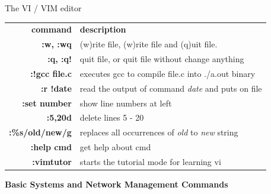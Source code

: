 \documentclass{beamer}
\begin{document}
\begin{frame}[t]
{\begin{minipage}[t]{.50\linewidth}
\begin{block}{The VI / VIM editor}
{\begin{minipage}[t]{0.470\textwidth}
            \begin{tabular}{r p{14cm} }
                \textbf{command} & \textbf{description}\\
                \textbf{:w, :wq} & (w)rite file, (w)rite file and (q)uit file.\\
                \textbf{:q, :q!} & quit file, or quit file without change anything\\
                \textbf{:!gcc file.c} & executes gcc to compile file.c into ./a.out binary\\
                \textbf{:r !date} & read the output of command \textit{date} and puts on file\\
                \textbf{:set number} & show line numbers at left\\
                \textbf{:5,20d} & delete lines 5 - 20\\
                \textbf{:\%s/old/new/g} & replaces all occurrences of \textit{old} to \textit{new} string\\
                \textbf{:help cmd} & get help about cmd\\
                \textbf{:vimtutor} & starts the tutorial mode for learning vi\\
            \end{tabular}
        \end{minipage}
        }
        \end{block}
    
        \begin{center}
        \textbf{Basic Systems and Network Management Commands}
        \end{center}
        
        \vspace{10pt}
        

\end{minipage}}
\end{frame}
\end{document}

